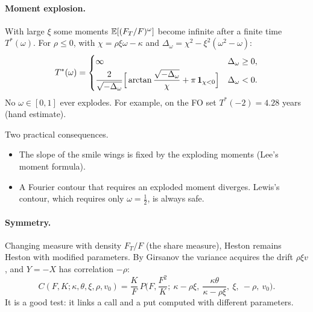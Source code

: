 \paragraph{Moment explosion.} With large $\xi$ some moments $\mathbb{E}[(F_T/F)^\omega]$ become infinite after a finite time
$T^*(\omega)$. For $\rho\le0$, with $\chi=\rho\xi\omega-\kappa$ and $\Delta_\omega=\chi^2-\xi^2(\omega^2-\omega)$:
\begin{equation}\label{eq:esplosione}
T^*(\omega)=\begin{cases}
\infty & \Delta_\omega\ge0,\\[2pt]
\dfrac{2}{\sqrt{-\Delta_\omega}}\Big[\arctan\dfrac{\sqrt{-\Delta_\omega}}{\chi}+\pi\,\mathbf{1}_{\chi<0}\Big] & \Delta_\omega<0.
\end{cases}
\end{equation}
No $\omega\in[0,1]$ ever explodes. For example, on the FO set $T^*(-2)=4.28$ years (hand estimate).

Two practical consequences.
\begin{itemize}
\item The slope of the smile wings is fixed by the exploding moments (Lee's moment formula).
\item A Fourier contour that requires an exploded moment diverges. Lewis's contour, which requires only
$\omega=\tfrac12$, is always safe.
\end{itemize}

\paragraph{Symmetry.} Changing measure with density $F_T/F$ (the share measure), Heston remains Heston with modified
parameters. By Girsanov the variance acquires the drift $\rho\xi v$, and $Y=-X$ has correlation $-\rho$:
\[
C(F,K;\kappa,\theta,\xi,\rho,v_0)=\frac KF\,P\Big(F,\frac{F^2}{K};\ \kappa-\rho\xi,\ \frac{\kappa\theta}{\kappa-\rho\xi},
\ \xi,\ -\rho,\ v_0\Big).
\]
It is a good test: it links a call and a put computed with different parameters.

